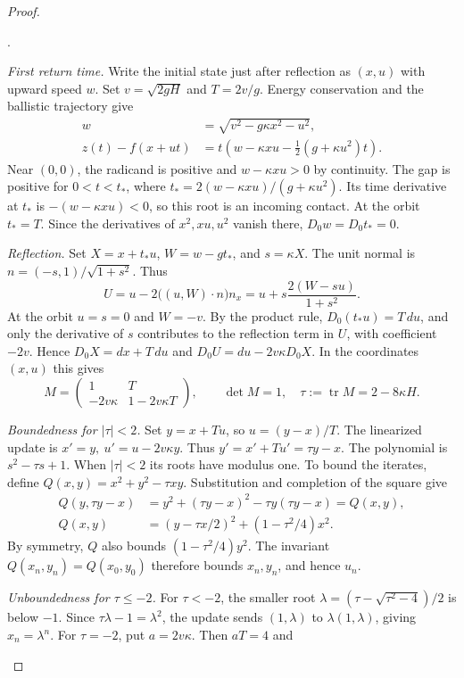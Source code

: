 \documentclass[10pt,letterpaper]{article}
\newenvironment{proofsteps}{%
  \setlength{\abovedisplayskip}{4pt}%
  \setlength{\belowdisplayskip}{4pt}%
  \setlength{\abovedisplayshortskip}{3pt}%
  \setlength{\belowdisplayshortskip}{3pt}%
  \begin{list}{\arabic{enumi}.}{\usecounter{enumi}%
    \setlength{\leftmargin}{1.45em}\setlength{\labelsep}{0.4em}%
    \setlength{\topsep}{2pt}\setlength{\itemsep}{2pt}%
    \setlength{\parsep}{0pt}\setlength{\partopsep}{0pt}}%
}{\end{list}}
\begin{document}
\begin{proof}
\begin{proofsteps}
\item \textit{First return time.} Write the initial state just after reflection as \((x,u)\) with upward speed \(w\). Set \(v=\sqrt{2gH}\) and \(T=2v/g\). Energy conservation and the ballistic trajectory give
\[
\begin{aligned}
w&=\sqrt{v^2-g\kappa x^2-u^2},\\
z(t)-f(x+ut)&=t\left(w-\kappa xu-\tfrac12(g+\kappa u^2)t\right).
\end{aligned}
\]
Near \((0,0)\), the radicand is positive and \(w-\kappa xu>0\) by continuity. The gap is positive for \(0<t<t_*\), where \(t_*=2(w-\kappa xu)/(g+\kappa u^2)\). Its time derivative at \(t_*\) is \(-(w-\kappa xu)<0\), so this root is an incoming contact. At the orbit \(t_*=T\). Since the derivatives of \(x^2,xu,u^2\) vanish there, \(D_0w=D_0t_*=0\).
\item \textit{Reflection.} Set \(X=x+t_*u\), \(W=w-gt_*\), and \(s=\kappa X\). The unit normal is \(n=(-s,1)/\sqrt{1+s^2}\). Thus
\[
U=u-2\big((u,W)\cdot n\big)n_x=u+s\frac{2(W-su)}{1+s^2}.
\]
At the orbit \(u=s=0\) and \(W=-v\). By the product rule, \(D_0(t_*u)=T\,du\), and only the derivative of \(s\) contributes to the reflection term in \(U\), with coefficient \(-2v\). Hence \(D_0X=dx+T\,du\) and \(D_0U=du-2v\kappa D_0X\). In the coordinates \((x,u)\) this gives
\[
M=\begin{pmatrix}1&T\\-2v\kappa&1-2v\kappa T\end{pmatrix},
\qquad \det M=1,\quad \tau:=\operatorname{tr}M=2-8\kappa H.
\]
\item \textit{Boundedness for \(|\tau|<2\).} Set \(y=x+Tu\), so \(u=(y-x)/T\). The linearized update is \(x'=y,\ u'=u-2v\kappa y\). Thus \(y'=x'+Tu'=\tau y-x\). The polynomial is \(s^2-\tau s+1\). When \(|\tau|<2\) its roots have modulus one. To bound the iterates, define \(Q(x,y)=x^2+y^2-\tau xy\). Substitution and completion of the square give
\[
\begin{aligned}
Q(y,\tau y-x)&=y^2+(\tau y-x)^2-\tau y(\tau y-x)=Q(x,y),\\
Q(x,y)&=(y-\tau x/2)^2+(1-\tau^2/4)x^2.
\end{aligned}
\]
By symmetry, \(Q\) also bounds \((1-\tau^2/4)y^2\). The invariant \(Q(x_n,y_n)=Q(x_0,y_0)\) therefore bounds \(x_n,y_n\), and hence \(u_n\).
\item \textit{Unboundedness for \(\tau\le-2\).} For \(\tau<-2\), the smaller root \(\lambda=(\tau-\sqrt{\tau^2-4})/2\) is below \(-1\). Since \(\tau\lambda-1=\lambda^2\), the update sends \((1,\lambda)\) to \(\lambda(1,\lambda)\), giving \(x_n=\lambda^n\). For \(\tau=-2\), put \(a=2v\kappa\). Then \(aT=4\) and

\end{proofsteps}
\end{proof}
\end{document}
